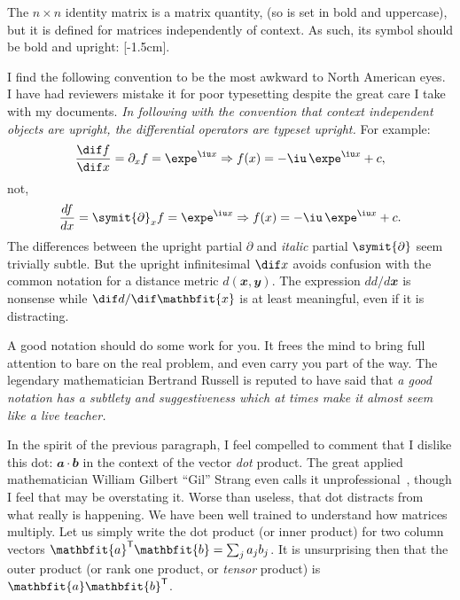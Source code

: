 The $n\times n$ identity matrix is a matrix quantity, (so is set in bold and
uppercase), but it is defined for matrices independently of context. As such,
its symbol should be bold and upright: [-1.5cm].

I find the following convention to be the most awkward to North American eyes. I
have had reviewers mistake it for poor typesetting despite the great care I take
with my documents. \textit{In following with the convention that context
independent objects are upright, the differential operators are typeset
upright.}\/ For example:
\[
  \diff{f}{x} = \partial_x f = \expe^{\iu x}  \implies f(x) = -\iu\,\expe^{\iu x}+c,
\]
not,
\[
  \frac{df}{dx} = \symit{\partial}_x f = \expe^{\iu x}  \implies f(x) = -\iu\,\expe^{\iu x}+c.
\]
The differences between the upright partial $\partial$ and \textit{italic}
partial $\symit{\partial}$ seem trivially subtle. But the upright infinitesimal
$\dif x$ avoids confusion with the common notation for a distance metric
$d(\mathbfit{x}, \mathbfit{y})$. The expression $d d/d\mathbfit{x}$ is nonsense
while $\dif d/\dif\mathbfit{x}$ is at least meaningful, even if it is
distracting.

A good notation should do some work for you. It frees the mind to bring full
attention to bare on the real problem, and even carry you part of the way. The
legendary mathematician Bertrand Russell is reputed to have said that \textit{a
good notation has a subtlety and suggestiveness which at times make it almost
seem like a live teacher.}

In the spirit of the previous paragraph, I feel compelled to comment that I
dislike this dot: $\mathbfit{a}\cdot\mathbfit{b}$ in the context of the vector
\emph{dot} product. The great applied mathematician William Gilbert ``Gil''
Strang even calls it unprofessional~\cite[p.~108]{Strang09}, though I feel that
may be overstating it. Worse than useless, that dot distracts from what really
is happening. We have been well trained to understand how matrices multiply. Let
us simply write the dot product (or inner
product) for two column vectors
$\mathbfit{a}\tr\mathbfit{b} = \sum_j a_j b_j$. It is unsurprising then that the
outer product (or rank one product, or \textit{tensor} product) is
$\mathbfit{a}\mathbfit{b}\tr$.

